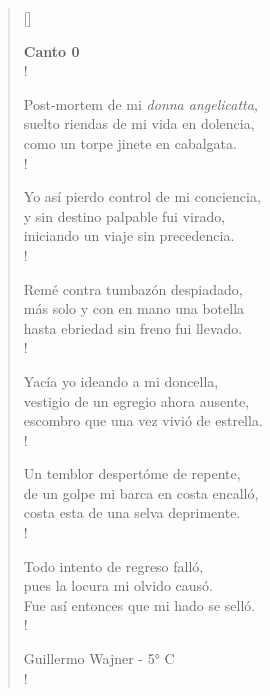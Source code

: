 \documentclass[11pt, a4paper]{article}
\begin{document}
{\sffamily

\vspace{\stanzaskip}

\settowidth{\versewidth}{costa esta de una selva deprimente.}

\begin{verse}[\versewidth]

\textbf{\large{Canto 0}}\\!

Post-mortem de mi \textit{donna angelicatta},\\
suelto riendas de mi vida en dolencia,\\
como un torpe jinete en cabalgata.\\!

Yo así pierdo control de mi conciencia,\\
y sin destino palpable fui virado,\\
iniciando un viaje sin precedencia.\\!

Remé contra tumbazón despiadado,\\
más solo y con en mano una botella\\
hasta ebriedad sin freno fui llevado.\\!

Yacía yo ideando a mi doncella,\\
vestigio de un egregio ahora ausente,\\
escombro que una vez vivió de estrella.\\!

Un temblor despertóme de repente,\\
de un golpe mi barca en costa encalló,\\
costa esta de una selva deprimente.\\!

Todo intento de regreso falló,\\
pues la locura mi olvido causó.\\
Fue así entonces que mi hado se selló.\\!

\vspace{\stanzaskip}

Guillermo Wajner - 5° C\\!

\end{verse}

}
\end{document}
